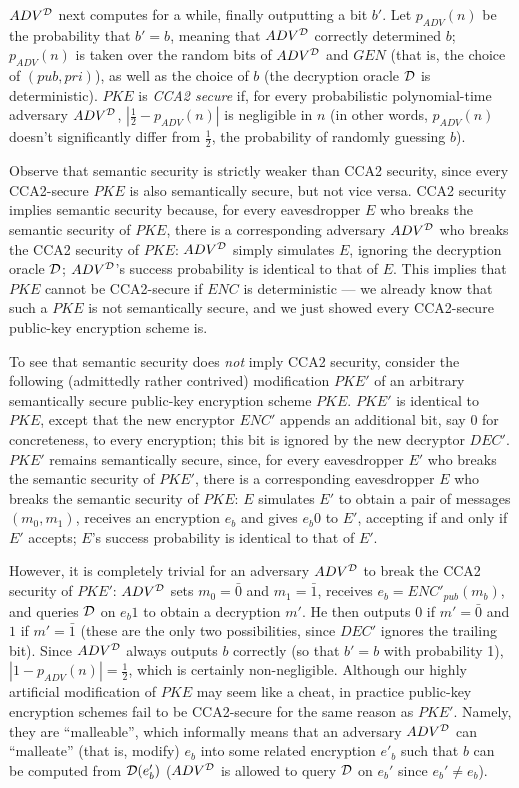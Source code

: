$ADV^{\mathcal{D}}$ next computes for a while, finally outputting a bit $b'$.  Let
$p_{ADV}(n)$ be the probability that $b' = b$, meaning that $ADV^{\mathcal{D}}$
correctly determined $b$; $p_{ADV}(n)$ is taken over the random bits of
$ADV^{\mathcal{D}}$ and $GEN$ (that is, the choice of $(pub,pri)$), as well as the
choice of $b$ (the decryption oracle $\mathcal{D}$ is deterministic).
$PKE$ is {\it CCA2 secure} if, for every probabilistic polynomial-time
adversary $ADV^{\mathcal{D}}$, $|\frac{1}{2} - p_{ADV}(n)|$ is negligible in $n$ (in
other words, $p_{ADV}(n)$ doesn't significantly differ from $\frac{1}{2}$, the
probability of randomly guessing $b$).

Observe that semantic security is strictly weaker than CCA2 security, since
every CCA2-secure $PKE$ is also semantically secure, but not vice versa. CCA2
security implies semantic security because, for every eavesdropper $E$ who
breaks the semantic security of $PKE$, there is a corresponding adversary
$ADV^{\mathcal{D}}$ who breaks the CCA2 security of $PKE$: $ADV^{\mathcal{D}}$ simply
simulates $E$, ignoring the decryption oracle $\mathcal{D}$; $ADV^{\mathcal{D}}$'s success
probability is identical to that of $E$. This implies that $PKE$ cannot be
CCA2-secure if $ENC$ is deterministic --- we already know that such a $PKE$ is
not semantically secure, and we just showed every CCA2-secure public-key
encryption scheme is.

To see that semantic security does {\it not} imply CCA2 security, consider the
following (admittedly rather contrived) modification $PKE'$ of an arbitrary
semantically secure public-key encryption scheme $PKE$. $PKE'$ is identical to
$PKE$, except that the new encryptor $ENC'$ appends an additional bit, say 0
for concreteness, to every encryption; this bit is ignored by the new
decryptor $DEC'$. $PKE'$ remains semantically secure, since, for every
eavesdropper $E'$ who breaks the semantic security of $PKE'$, there is a
corresponding eavesdropper $E$ who breaks the semantic security of $PKE$: $E$
simulates $E'$ to obtain a pair of messages $(m_0,m_1)$, receives
an encryption $e_b$ and gives $e_b 0$ to $E'$, accepting if and only if $E'$
accepts; $E$'s success probability is identical to that of $E'$. 

However, it is completely trivial for an adversary $ADV^{\mathcal{D}}$ to break the
CCA2 security of $PKE'$: $ADV^{\mathcal{D}}$ sets $m_0 = \bar{0}$ and $m_1 = \bar{1}$,
receives $e_b = ENC'_{pub}(m_b)$, and queries $\mathcal{D}$ on $e_b 1$ to obtain a
decryption $m'$. He then outputs $0$ if $m' = \bar{0}$ and $1$ if $m' =
\bar{1}$ (these are the only two possibilities, since $DEC'$ ignores the
trailing bit). Since $ADV^{\mathcal{D}}$ always outputs $b$ correctly (so that $b' =
b$ with probability 1), $|1 - p_{ADV}(n)| = \frac{1}{2}$, which is certainly
non-negligible.  Although our highly artificial modification of $PKE$ may seem
like a cheat, in practice public-key encryption schemes fail to be CCA2-secure
for the same reason as $PKE'$. Namely, they are ``malleable'', which
informally means that an adversary $ADV^{\mathcal{D}}$ can ``malleate'' (that is,
modify) $e_b$ into some related encryption $e'_b$ such that $b$ can be
computed from $\mathcal{D}(e'_b)$ ($ADV^{\mathcal{D}}$ is allowed to query $\mathcal{D}$ on $e_b'$
since $e_b' \neq e_b$).

